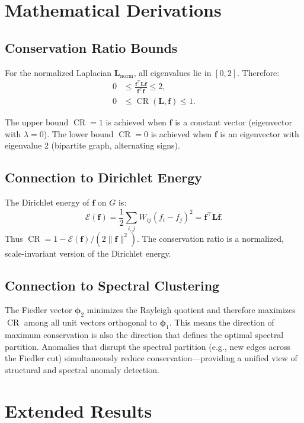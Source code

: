 \documentclass[11pt,a4paper]{article}
\newcommand{\bff}{\mathbf{f}}
\newcommand{\bL}{\mathbf{L}}
\newcommand{\bphi}{\boldsymbol{\phi}}
\DeclareMathOperator{\CR}{CR}
\begin{document}
\section{Mathematical Derivations}\label{app:derivations}

\subsection{Conservation Ratio Bounds}

For the normalized Laplacian $\bL_{\mathrm{norm}}$, all eigenvalues lie in $[0, 2]$.
Therefore:
\begin{align}
  0 &\leq \frac{\bff^\top \bL \bff}{\bff^\top \bff} \leq 2, \\
  0 &\leq \CR(\bL, \bff) \leq 1.
\end{align}

The upper bound $\CR = 1$ is achieved when $\bff$ is a constant vector
(eigenvector with $\lambda = 0$).  The lower bound $\CR = 0$ is achieved when
$\bff$ is an eigenvector with eigenvalue 2 (bipartite graph, alternating signs).

\subsection{Connection to Dirichlet Energy}

The Dirichlet energy of $\bff$ on $G$ is:
\begin{equation}
  \mathcal{E}(\bff) = \frac{1}{2}\sum_{i,j} W_{ij}(f_i - f_j)^2 = \bff^\top \bL \bff.
\end{equation}
Thus $\CR = 1 - \mathcal{E}(\bff) / (2\|\bff\|^2)$.  The conservation ratio is
a normalized, scale-invariant version of the Dirichlet energy.

\subsection{Connection to Spectral Clustering}

The Fiedler vector $\bphi_2$ minimizes the Rayleigh quotient and therefore
maximizes $\CR$ among all unit vectors orthogonal to $\bphi_1$.  This means the
direction of maximum conservation is also the direction that defines the optimal
spectral partition.  Anomalies that disrupt the spectral partition (e.g., new
edges across the Fiedler cut) simultaneously reduce conservation---providing a
unified view of structural and spectral anomaly detection.

\section{Extended Results}\label{app:extended}
\end{document}
